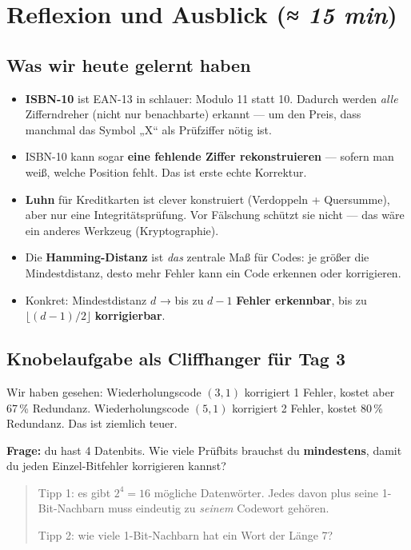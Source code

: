 \section{Reflexion und Ausblick \normalfont(\textit{≈ 15 min})}

\subsection*{Was wir heute gelernt haben}

\begin{itemize}
\item \textbf{ISBN-10} ist EAN-13 in schlauer: Modulo 11 statt 10.
  Dadurch werden \emph{alle} Zifferndreher (nicht nur benachbarte)
  erkannt — um den Preis, dass manchmal das Symbol „X“ als Prüfziffer
  nötig ist.
\item ISBN-10 kann sogar \textbf{eine fehlende Ziffer rekonstruieren}
  — sofern man weiß, welche Position fehlt. Das ist erste echte
  Korrektur.
\item \textbf{Luhn} für Kreditkarten ist clever konstruiert
  (Verdoppeln + Quersumme), aber nur eine Integritätsprüfung. Vor
  Fälschung schützt sie nicht — das wäre ein anderes Werkzeug
  (Kryptographie).
\item Die \textbf{Hamming-Distanz} ist \emph{das} zentrale Maß für
  Codes: je größer die Mindestdistanz, desto mehr Fehler kann ein Code
  erkennen oder korrigieren.
\item Konkret: Mindestdistanz $d$ → bis zu $d-1$ \textbf{Fehler
  erkennbar}, bis zu $\lfloor (d-1)/2 \rfloor$ \textbf{korrigierbar}.
\end{itemize}

\subsection*{Knobelaufgabe als Cliffhanger für Tag 3}

Wir haben gesehen: Wiederholungscode $(3,1)$ korrigiert 1 Fehler,
kostet aber 67\,\% Redundanz. Wiederholungscode $(5,1)$ korrigiert 2
Fehler, kostet 80\,\% Redundanz. Das ist ziemlich teuer.

\textbf{Frage:} du hast 4 Datenbits. Wie viele Prüfbits brauchst du
\textbf{mindestens}, damit du jeden Einzel-Bitfehler korrigieren
kannst?

\begin{quote}
Tipp 1: es gibt $2^4 = 16$ mögliche Datenwörter. Jedes davon plus
seine 1-Bit-Nachbarn muss eindeutig zu \emph{seinem} Codewort gehören.

Tipp 2: wie viele 1-Bit-Nachbarn hat ein Wort der Länge 7?
\end{quote}


